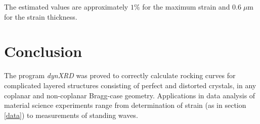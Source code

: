 \documentclass[12pt,oneside,notitlepage,abstracton,a4paper]{scrartcl}
\begin{document}
The estimated values are approximately $1 \%$ for the maximum strain and $0.6\;\mu$m for the strain thickness.\\

% 
% 



\section{Conclusion}
The program \textit{dynXRD} was proved to correctly calculate rocking curves for complicated layered structures consisting of perfect and distorted crystals, in any coplanar and non-coplanar Bragg-case geometry. Applications in data analysis of material science experiments range from determination of strain (as in section \ref{data}) to measurements of standing waves.

\clearpage 



\nocite{*}
 
{}
\end{document}
